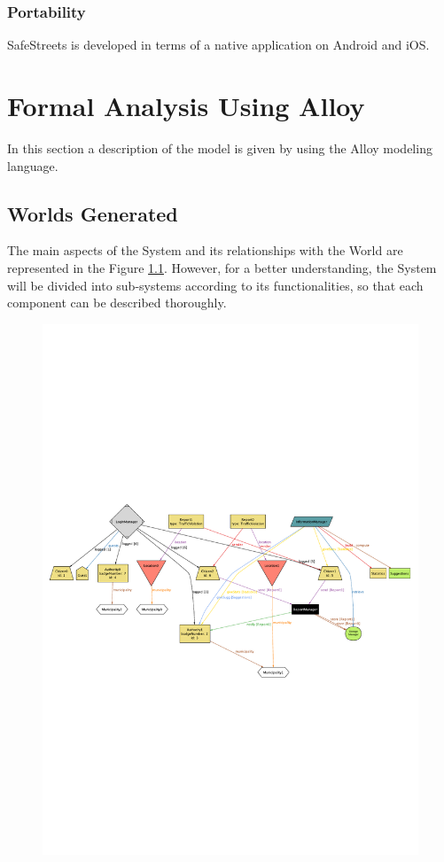 \documentclass{report}
\begin{document}
\subsection{Portability}
SafeStreets is developed in terms of a native application on Android and iOS.

\chapter{Formal Analysis Using Alloy}
In this section a description of the model is given by using the Alloy modeling language.
\section{Worlds Generated}
The main aspects of the System and its relationships with the World are represented in the Figure \ref{fig:all-oy}. However, for a better understanding, the System will be divided into sub-systems according to its functionalities, so that each component can be described thoroughly.
\begin{figure}[ht!]
	\begin{center}
	\includegraphics[width=\textwidth]{./img/Prova.pdf}
	\label{fig:all-oy}
	\caption{}
	\end{center}
\end{figure}\\
\end{document}
